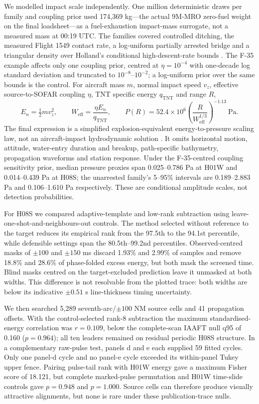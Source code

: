 We modelled impact scale independently. One million deterministic draws per
family and coupling prior used 174,369 kg---the actual 9M-MRO zero-fuel weight
on the final loadsheet---as a fuel-exhaustion impact-mass surrogate, not a
measured mass at 00:19 UTC. The families covered controlled ditching, the
measured Flight 1549 contact rate, a log-uniform partially
arrested bridge and a triangular density over Holland's conditional
high-descent-rate bounds \citep{NTSB2010,Holland2018}. The F-35 example affects
only one coupling prior, centred at $\eta=10^{-4}$ with one-decade log standard
deviation and truncated to $10^{-8}$--$10^{-2}$; a log-uniform prior over the
same bounds is the control. For aircraft mass $m$,
normal impact speed $v_z$, effective source-to-SOFAR coupling $\eta$, TNT
specific energy $q_{\mathrm{TNT}}$ and range $R$,
\begin{equation}
E_n=\tfrac12 m v_z^2,\qquad
W_{\mathrm{eff}}=\frac{\eta E_n}{q_{\mathrm{TNT}}},\qquad
P(R)=52.4\times10^6
\left(\frac{R}{W_{\mathrm{eff}}^{1/3}}\right)^{-1.13}\ \mathrm{Pa}.
\label{eq:hydro-impact-pressure}
\end{equation}
The final expression is a simplified explosion-equivalent energy-to-pressure
scaling law, not an aircraft-impact hydrodynamic solution
\citep{BrownEtAl2026}. It omits horizontal motion, attitude, water-entry
duration and breakup, path-specific bathymetry, propagation waveforms and
station response. Under the
F-35-centred coupling sensitivity prior, median pressure proxies span
0.025--0.786 Pa at H01W and 0.014--0.439 Pa at H08S; the unarrested family's
5--95\% intervals are 0.189--2.883 Pa and 0.106--1.610 Pa respectively. These
are conditional amplitude scales, not detection probabilities.

For H08S we compared adaptive-template and low-rank subtraction using
leave-one-shot-and-neighbours-out controls. The method selected without
reference to the target reduces its empirical rank from the 97.5th to the
94.1st percentile, while defensible settings span the 80.5th--99.2nd
percentiles. Observed-centred masks of $\pm100$ and $\pm150$ ms discard 1.93\%
and 2.99\% of samples and remove 18.8\% and 28.6\% of phase-folded excess energy,
but both mask the screened time. Blind masks centred on the target-excluded
prediction leave it unmasked at both widths. This difference is not resolvable
from the plotted trace: both widths are below its indicative $\pm0.51$ s
line-thickness timing uncertainty.

We then searched 5,289 seventh-arc/$\pm100$ NM source cells and 41
propagation offsets. With the control-selected rank-8 subtraction the maximum
standardised-energy correlation was $r=0.109$, below the complete-scan IAAFT
null q95 of 0.160 ($p=0.964$); all ten leaders remained on residual periodic
H08S structure. In a complementary raw-pulse test, panels d and e each supplied
59 fitted cycles. Only one panel-d cycle and no panel-e cycle exceeded its
within-panel Tukey upper fence. Pairing pulse-tail rank with H01W energy gave a
maximum Fisher score of 18.121, but complete marked-pulse permutation and H01W
time-slide controls gave $p=0.948$ and $p=1.000$. Source cells can therefore
produce visually attractive alignments, but none is rare under these
publication-trace nulls.

